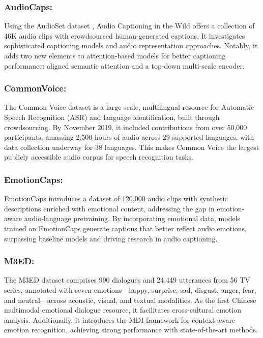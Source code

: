 \documentclass[runningheads]{llncs}
\begin{document}
\subsubsection{AudioCaps:}
Using the AudioSet dataset \cite{ref89}, Audio Captioning in the Wild \cite{ref81} offers a collection of 46K audio clips with crowdsourced human-generated captions. It investigates sophisticated captioning models and audio representation approaches. Notably, it adds two new elements to attention-based models for better captioning performance: aligned semantic attention and a top-down multi-scale encoder.

\subsubsection{CommonVoice:}
The Common Voice dataset \cite{ref82} is a large-scale, multilingual resource for Automatic Speech Recognition (ASR) and language identification, built through crowdsourcing. By November 2019, it included contributions from over 50,000 participants, amassing 2,500 hours of audio across 29 supported languages, with data collection underway for 38 languages. This makes Common Voice the largest publicly accessible audio corpus for speech recognition tasks.

\subsubsection{EmotionCaps:}
EmotionCaps \cite{ref83} introduces a dataset of 120,000 audio clips with synthetic descriptions enriched with emotional content, addressing the gap in emotion-aware audio-language pretraining. By incorporating emotional data, models trained on EmotionCaps generate captions that better reflect audio emotions, surpassing baseline models and driving research in audio captioning.

\subsubsection{M3ED:}
The M3ED dataset \cite{ref84} comprises 990 dialogues and 24,449 utterances from 56 TV series, annotated with seven emotions—happy, surprise, sad, disgust, anger, fear, and neutral—across acoustic, visual, and textual modalities. As the first Chinese multimodal emotional dialogue resource, it facilitates cross-cultural emotion analysis. Additionally, it introduces the MDI framework for context-aware emotion recognition, achieving strong performance with state-of-the-art methods.
\end{document}
